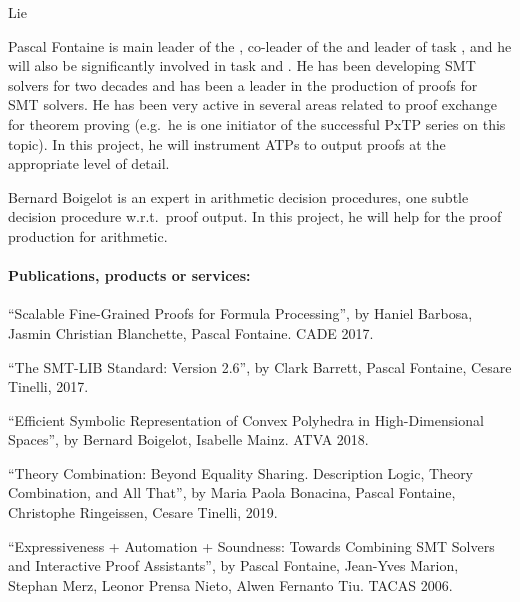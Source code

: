 \begin{sitedescription}{Lie}
\begin{compactitem}
\item Pascal Fontaine is main leader of the , co-leader of the  and leader of task
  , and he will also be significantly involved in
  task  and .  He
  has been developing SMT solvers for two decades and has been a leader in the
  production of proofs for SMT solvers.  He has been very active in several
  areas related to proof exchange for theorem proving (e.g.\ he is one initiator
  of the successful PxTP series on this topic).  In this project, he will instrument ATPs to
  output proofs at the appropriate level of detail.
\item Bernard Boigelot is an expert in arithmetic decision procedures, one
  subtle decision procedure w.r.t.\ proof output.  In this project, he will help
  for the proof production for arithmetic.
\end{compactitem}

\paragraph*{Publications, products or services:}

\begin{compactitem}
\item ``Scalable Fine-Grained Proofs for Formula Processing'', by Haniel Barbosa, Jasmin Christian Blanchette, Pascal Fontaine. CADE 2017.

\item ``The SMT-LIB Standard: Version 2.6'', by Clark Barrett, Pascal Fontaine, Cesare Tinelli, 2017.

\item ``Efficient Symbolic Representation of Convex Polyhedra in High-Dimensional Spaces'', by Bernard Boigelot, Isabelle Mainz. ATVA 2018.

\item ``Theory Combination: Beyond Equality Sharing. Description Logic, Theory Combination, and All That'', by Maria Paola Bonacina, Pascal Fontaine, Christophe Ringeissen, Cesare Tinelli, 2019.

\item ``Expressiveness + Automation + Soundness: Towards Combining SMT Solvers and Interactive Proof Assistants'', by Pascal Fontaine, Jean-Yves Marion, Stephan Merz, Leonor Prensa Nieto, Alwen Fernanto Tiu. TACAS 2006.
\end{compactitem}


\end{sitedescription}
